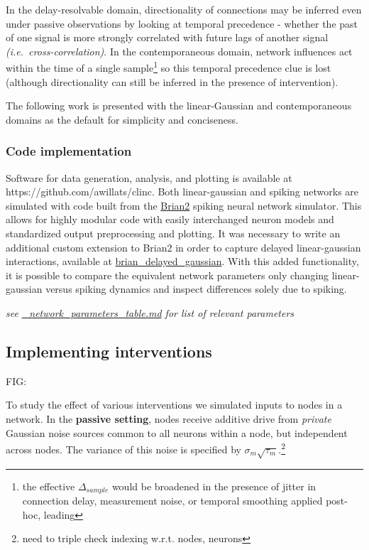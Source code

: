 In the delay-resolvable domain, directionality of connections may be
inferred even under passive observations by looking at temporal
precedence - whether the past of one signal is more strongly correlated
with future lags of another signal \emph{(i.e.~cross-correlation)}. In
the contemporaneous domain, network influences act within the time of a
single sample\footnote{the effective \(\Delta_{sample}\) would be
  broadened in the presence of jitter in connection delay, measurement
  noise, or temporal smoothing applied post-hoc, leading} so this
temporal precedence clue is lost (although directionality can still be
inferred in the presence of intervention).

The following work is presented with the linear-Gaussian and
contemporaneous domains as the default for simplicity and conciseness.

\hypertarget{code-implementation}{%
\subsubsection{Code implementation}\label{code-implementation}}

Software for data generation, analysis, and plotting is available at
https://github.com/awillats/clinc. Both linear-gaussian and spiking
networks are simulated with code built from the
\href{https://elifesciences.org/articles/47314}{Brian2} spiking neural
network simulator. This allows for highly modular code with easily
interchanged neuron models and standardized output preprocessing and
plotting. It was necessary to write an additional custom extension to
Brian2 in order to capture delayed linear-gaussian interactions,
available at
\href{https://github.com/awillats/brian_delayed_gaussian}{brian\_delayed\_gaussian}.
With this added functionality, it is possible to compare the equivalent
network parameters only changing linear-gaussian versus spiking dynamics
and inspect differences solely due to spiking.

\emph{see \url{_network_parameters_table.md} for list of relevant
parameters}

\hypertarget{implementing-interventions}{%
\subsection{Implementing
interventions}\label{implementing-interventions}}

FIG: %

To study the effect of various interventions we simulated inputs to
nodes in a network. In the \textbf{passive setting}, nodes receive
additive drive from \emph{private} Gaussian noise sources common to all
neurons within a node, but independent across nodes. The variance of
this noise is specified by \(\sigma_m \sqrt{\tau_m}\).\footnote{need to
  triple check indexing w.r.t. nodes, neurons}

